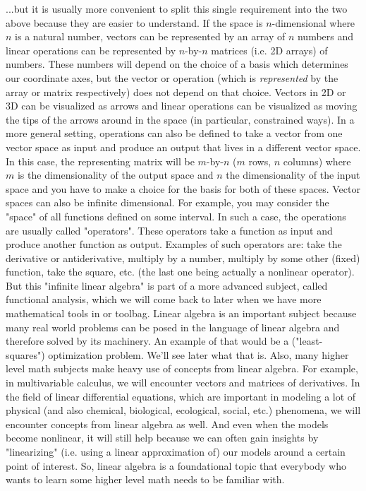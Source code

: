 ...but it is usually more convenient to split this single requirement into the two above because they are easier to understand. If the space is $n$-dimensional where $n$ is a natural number, vectors can be represented by an array of $n$ numbers and linear operations can be represented by $n$-by-$n$ matrices (i.e. 2D arrays) of numbers. These numbers will depend on the choice of a basis which determines our coordinate axes, but the vector or operation (which is \emph{represented} by the array or matrix respectively) does not depend on that choice. Vectors in 2D or 3D can be visualized as arrows and linear operations can be visualized as moving the tips of the arrows around in the space (in particular, constrained ways). In a more general setting, operations can also be defined to take a vector from one vector space as input and produce an output that lives in a different vector space. In this case, the representing matrix will be $m$-by-$n$ ($m$ rows, $n$ columns) where $m$ is the dimensionality of the output space and $n$ the dimensionality of the input space and you have to make a choice for the basis for both of these spaces. Vector spaces can also be infinite dimensional. For example, you may consider the "space" of all functions defined on some interval. In such a case, the operations are usually called "operators". These operators take a function as input and produce another function as output. Examples of such operators are: take the derivative or antiderivative, multiply by a number, multiply by some other (fixed) function, take the square, etc. (the last one being actually a nonlinear operator). But this "infinite linear algebra" is part of a more advanced subject, called functional analysis, which we will come back to later when we have more mathematical tools in or toolbag. Linear algebra is an important subject because many real world problems can be posed in the language of linear algebra and therefore solved by its machinery. An example of that would be a ("least-squares") optimization problem. We'll see later what that is. Also, many higher level math subjects make heavy use of concepts from linear algebra. For example, in multivariable calculus, we will encounter vectors and matrices of derivatives. In the field of linear differential equations, which are important in modeling a lot of physical (and also chemical, biological, ecological, social, etc.) phenomena, we will encounter concepts from linear algebra as well. And even when the models become nonlinear, it will still help because we can often gain insights by "linearizing" (i.e. using a linear approximation of) our models around a certain point of interest. So, linear algebra is a foundational topic that everybody who wants to learn some higher level math needs to be familiar with.


